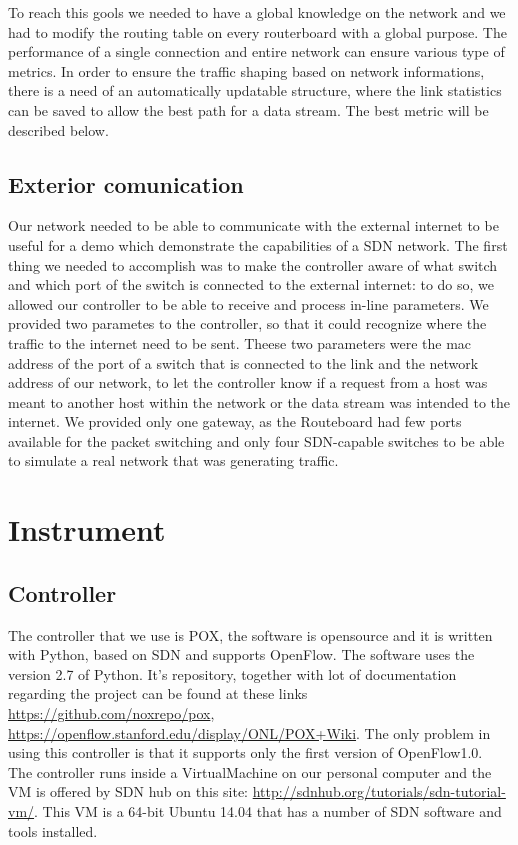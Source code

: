 \documentclass[article,10pt]{IEEEtran}
\begin{document}
To reach this gools we needed to have a global knowledge on the network and we had to modify the routing table on every routerboard with a
global purpose.
The performance of a single connection and entire network can ensure various type of metrics.
In order to ensure the traffic shaping based on network informations, there is a need of an automatically updatable structure,
where the link statistics can be saved to allow the best path for a data stream. 
The best metric will be described below.

\subsection{Exterior comunication}
Our network needed to be able to communicate with the external internet to be useful for a demo which demonstrate the capabilities of a SDN network.
The first thing we needed to accomplish was to make the controller aware of what switch and which port of the switch is connected to the external internet:
to do so, we allowed our controller to be able to receive and process in-line parameters. We provided two parametes to the controller, so that
it could recognize where the traffic to the internet need to be sent. Theese two parameters were the mac address of the
port of a switch that is connected to the link and the network address of our network, to let the controller know if a request from a host was meant to another host
within the network or the data stream was intended to the internet. We provided only one gateway, as the Routeboard had few ports available for the packet switching
and only four SDN-capable switches to be able to simulate a real network that was generating traffic.


\section{Instrument}\label{sec:instrument}
\subsection{Controller}
The controller that we use is POX, the software is opensource and it is written with Python, based on SDN and supports OpenFlow.
The software uses the version 2.7 of Python.
It's repository, together with lot of documentation regarding the project can be found at these links \url{https://github.com/noxrepo/pox}, \url{https://openflow.stanford.edu/display/ONL/POX+Wiki}.
The only problem in using this controller is that it supports only the first version of OpenFlow1.0.
\\
The controller runs inside a VirtualMachine on our personal computer and the VM is offered by SDN hub on this site: \url{http://sdnhub.org/tutorials/sdn-tutorial-vm/}.
This VM is a 64-bit Ubuntu 14.04 that has a number of SDN software and tools installed.
\end{document}

